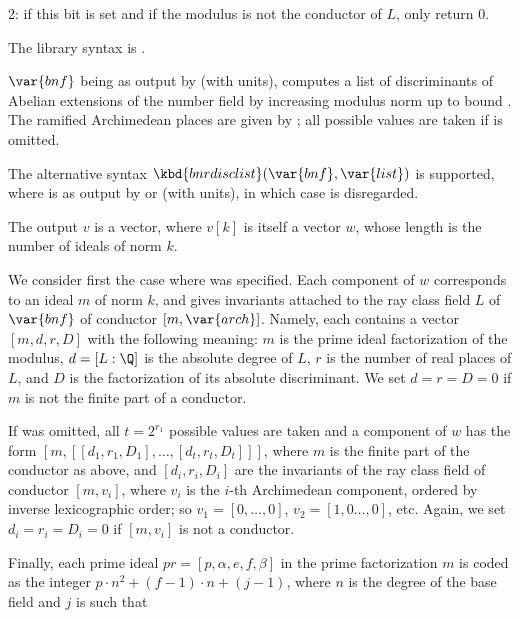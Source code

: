 \item 2: if this bit is set and if the modulus is not the conductor of $L$,
only return 0.

The library syntax is .

\label{se:bnrdisclist}
$\var{bnf}$ being as output by  (with units), computes a
list of discriminants of Abelian extensions of the number field by increasing
modulus norm up to bound . The ramified Archimedean places are
given by ; all possible values are taken if  is omitted.

The alternative syntax $\kbd{bnrdisclist}(\var{bnf},\var{list})$ is
supported, where  is as output by  or
 (with units), in which case  is disregarded.

The output $v$ is a vector, where $v[k]$ is itself a vector $w$, whose length
is the number of ideals of norm $k$.

\item We consider first the case where  was specified. Each
component of $w$ corresponds to an ideal $m$ of norm $k$, and
gives invariants attached to the ray class field $L$ of $\var{bnf}$ of
conductor $[m, \var{arch}]$. Namely, each contains a vector $[m,d,r,D]$ with
the following meaning: $m$ is the prime ideal factorization of the modulus,
$d = [L:\Q]$ is the absolute degree of $L$, $r$ is the number of real places
of $L$, and $D$ is the factorization of its absolute discriminant. We set $d
= r = D = 0$ if $m$ is not the finite part of a conductor.

\item If  was omitted, all $t = 2^{r_1}$ possible values are taken
and a component of $w$ has the form
$[m, [[d_1,r_1,D_1], \dots, [d_t,r_t,D_t]]]$,
where $m$ is the finite part of the conductor as above, and
$[d_i,r_i,D_i]$ are the invariants of the ray class field of conductor
$[m,v_i]$, where $v_i$ is the $i$-th Archimedean component, ordered by
inverse lexicographic order; so $v_1 = [0,\dots,0]$, $v_2 = [1,0\dots,0]$,
etc. Again, we set $d_i = r_i = D_i = 0$ if $[m,v_i]$ is not a conductor.

Finally, each prime ideal $pr = [p,\alpha,e,f,\beta]$ in the prime
factorization $m$ is coded as the integer $p\cdot n^2+(f-1)\cdot n+(j-1)$,
where $n$ is the degree of the base field and $j$ is such that

